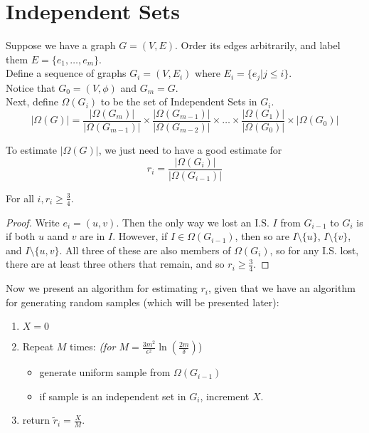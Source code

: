 
\section{Independent Sets}

Suppose we have a graph $G = (V,E)$. Order its edges arbitrarily, and label them $E = \{e_1, \ldots, e_m\}$. \\
Define a sequence of graphs $G_i = (V, E_i)$ where $E_i = \{ e_j | j \leq i \}$. \\
Notice that $G_0 = (V, \phi)$ and $G_m = G$. \\
Next, define $\Omega(G_i)$ to be the set of Independent Sets in $G_i$.
\[ |\Omega(G)| = \frac{|\Omega(G_m)|}{|\Omega(G_{m-1})|} \times \frac{|\Omega(G_{m-1})|}{|\Omega(G_{m-2})|} \times \ldots \times \frac{|\Omega(G_1)|}{|\Omega(G_{0})|} \times |\Omega(G_0)| \]

To estimate $|\Omega(G)|$, we just need to have a good estimate for
\[ r_i = \frac{|\Omega(G_i)|}{|\Omega(G_{i-1})|} \]

\begin{lemma}
For all $i, r_i \geq \frac{3}{4}$.
\end{lemma}
\begin{proof}
Write $e_i = (u,v)$. Then the only way we lost an I.S. $I$ from $G_{i-1}$ to $G_i$ is if both $u$ aand $v$ are in $I$. However, if $I \in \Omega(G_{i-1})$, then so are $I \setminus \{u\}$, $I \setminus \{v\}$, and $I \setminus \{u, v\}$. All three of these are also members of $\Omega(G_i)$, so for any I.S. lost, there are at least three others that remain, and so $r_i \geq \frac{3}{4}$.
\end{proof}

Now we present an algorithm for estimating $r_i$, given that we have an algorithm for generating random samples (which will be presented later):

\begin{enumerate}
\item $X = 0$
\item Repeat $M$ times: \emph{(for $M = \frac{3m^2}{\epsilon^2} \ln(\frac{2m}{\delta})$})
\begin{itemize}
\item generate uniform sample from $\Omega(G_{i-1})$
\item if sample is an independent set in $G_i$, increment $X$.
\end{itemize}
\item return $\tilde r_i = \frac{X}{M}$.
\end{enumerate}

